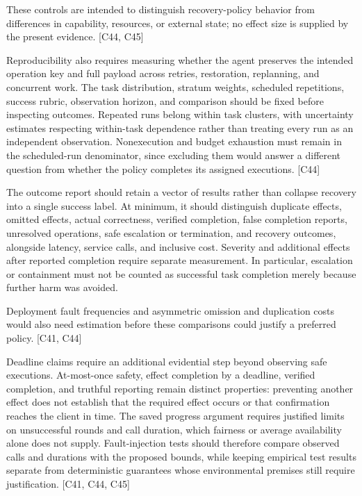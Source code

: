 \documentclass[11pt]{article}
\begin{document}
These controls are intended to distinguish recovery-policy behavior from differences in capability, resources, or external state; no effect size is supplied by the present evidence. [C44, C45]

Reproducibility also requires measuring whether the agent preserves the intended operation key and full payload across retries, restoration, replanning, and concurrent work. The task distribution, stratum weights, scheduled repetitions, success rubric, observation horizon, and comparison should be fixed before inspecting outcomes. Repeated runs belong within task clusters, with uncertainty estimates respecting within-task dependence rather than treating every run as an independent observation. Nonexecution and budget exhaustion must remain in the scheduled-run denominator, since excluding them would answer a different question from whether the policy completes its assigned executions. [C44]

The outcome report should retain a vector of results rather than collapse recovery into a single success label. At minimum, it should distinguish duplicate effects, omitted effects, actual correctness, verified completion, false completion reports, unresolved operations, safe escalation or termination, and recovery outcomes, alongside latency, service calls, and inclusive cost. Severity and additional effects after reported completion require separate measurement. In particular, escalation or containment must not be counted as successful task completion merely because further harm was avoided.

Deployment fault frequencies and asymmetric omission and duplication costs would also need estimation before these comparisons could justify a preferred policy. [C41, C44]

Deadline claims require an additional evidential step beyond observing safe executions. At-most-once safety, effect completion by a deadline, verified completion, and truthful reporting remain distinct properties: preventing another effect does not establish that the required effect occurs or that confirmation reaches the client in time. The saved progress argument requires justified limits on unsuccessful rounds and call duration, which fairness or average availability alone does not supply. Fault-injection tests should therefore compare observed calls and durations with the proposed bounds, while keeping empirical test results separate from deterministic guarantees whose environmental premises still require justification. [C41, C44, C45]
\end{document}
